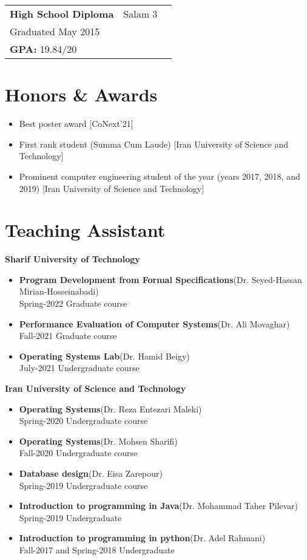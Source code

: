 \documentclass[11pt]{article}
\makeatletter
\newcommand*{\eduSmall}[5]
{\begin{table}[h!]
	\begin{tabular*}{\textwidth}{ll@{\extracolsep{\fill}}r}
		\textbf{#1} &  #2 & \\ %
		#3 &  & \\
		\multicolumn{3}{l}{#5}
	\end{tabular*}
\end{table}}
\newcommand*{\taRecord}[4]{\textbf{#1}\quad (#3) \\ #2 \quad  #4}
\makeatother
\begin{document}
\eduSmall{High School Diploma}
{Salam 3}
{Graduated May 2015}
{images/salam.png}
{\hspace{5mm} \textbf{GPA:} 19.84/20}

\section{Honors \& Awards}
\begin{itemize}
	\renewcommand\labelitemi{\ding{118}}
	\item {Best poster award [CoNext'21]}
	\item{First rank student (Summa Cum Laude) [Iran University of Science and Technology]}
	\item{Prominent computer engineering student of the year (years 2017, 2018, and 2019) [Iran University of Science and Technology]}
\end{itemize}

\section{Teaching Assistant}
\noindent \textbf{Sharif University of Technology} \par
{\renewcommand\labelitemi{}
\begin{itemize}[noitemsep,topsep=0pt,parsep=0pt,partopsep=0pt]
	\item \taRecord{Program Development from Formal Specifications}
		{Spring-2022}
		{Dr. Seyed-Hassan Mirian-Hosseinabadi}
		{Graduate course}
	\item \taRecord{Performance Evaluation of Computer Systems}
		{Fall-2021}
		{Dr. Ali Movaghar}
		{Graduate course}
	\item \taRecord{Operating Systems Lab}
		{July-2021}
		{Dr. Hamid Beigy}
		{Undergraduate course}
\end{itemize}
}

\noindent \textbf{Iran University of Science and Technology} \par
{
    \renewcommand\labelitemi{}
    \begin{itemize}[noitemsep,topsep=0pt,parsep=0pt,partopsep=0pt]
		\item \taRecord{Operating Systems}
			{Spring-2020}
			{Dr. Reza Entezari Maleki}
			{Undergraduate course}
		\item \taRecord{Operating Systems}
			{Fall-2020}
			{Dr. Mohsen Sharifi}
			{Undergraduate course}
		\item \taRecord{Database design}
			{Spring-2019}
			{Dr. Eisa Zarepour}
			{Undergraduate course}
		\item \taRecord{Introduction to programming in Java}
			{Spring-2019}
			{Dr. Mohammad Taher Pilevar}
			{Undergraduate}
		\item \taRecord{Introduction to programming in python}
			{Fall-2017 and Spring-2018}
			{Dr. Adel Rahmani}
			{Undergraduate}
    \end{itemize}
}
\end{document}
